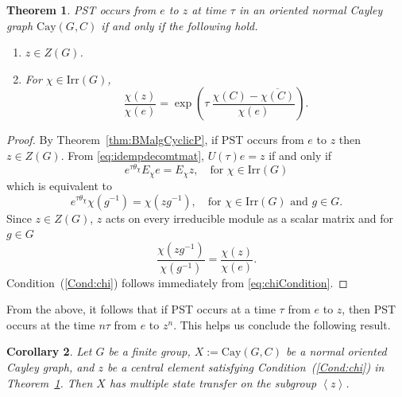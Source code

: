 \documentclass{amsart}
\theoremstyle{plain}
\newtheorem{theorem}{Theorem}[section]
\newtheorem{cor}[theorem]{Corollary}
\theoremstyle{remark}\newtheorem{con}[theorem]{Construction}
\theoremstyle{remark} \newtheorem*{remark}{Remark}
\theoremstyle{remark} \newtheorem{example}{Example}
\newcommand{\mrm}{\mathrm}
\newcommand{\ov}{\overline}
\newcommand{\irr}{\mathrm{Irr}}
\begin{document}
\begin{theorem}\label{thm:characterization}
PST occurs  from $e$ to $z$ at time $\tau$ in an oriented normal Cayley graph $\mrm{Cay}(G, C)$ if and only if the following hold.
\begin{enumerate}
\item $z\in Z(G)$.
\item \label{Cond:chi}
For $\chi \in \irr(G)$,
\[\dfrac{\chi(z)}{\chi(e)}=  \exp\left({\tau\ \dfrac{\chi(C)-\ov{\chi(C)}}{\chi(e)}}\right).\]
\end{enumerate}
\end{theorem}  
\begin{proof}
By Theorem~\ref{thm:BMalgCyclicP}, if PST occurs from $e$ to $z$ then $z\in Z(G)$.
From \eqref{eq:idempdecomtmat}, $U(\tau)e = z$ if and only if
\begin{equation*}
  e^{\tau \theta_{\chi}} E_{\chi}e = E_{\chi} z, \quad \text{for $\chi \in \irr(G)$} 
\end{equation*}
which is equivalent to
\begin{equation}\label{eq:chiCondition}
  e^{\tau \theta_{\chi}} \chi(g^{-1}) = \chi(zg^{-1}), \quad \text{for $\chi \in \irr(G)$ and $g\in G$.}
\end{equation}
Since $z \in Z(G)$, $z$ acts on every irreducible module as a scalar matrix
and for $g\in G$
\begin{equation*}
    \dfrac{\chi(zg^{-1})}{\chi(g^{-1})} = \dfrac{\chi(z)}{\chi(e)}.
\end{equation*}
Condition~(\ref{Cond:chi}) follows immediately from \eqref{eq:chiCondition}.
\end{proof}
From the above, it follows that if PST occurs at a time $\tau$ from $e$ to $z$, then PST occurs at the time $n\tau$ from $e$ to $z^n$. This helps us conclude the following result.
\begin{cor}\label{cor:multistate}
Let $G$ be a finite group, $X:=\mrm{Cay}(G, C)$ be a normal oriented Cayley graph, and $z$ be a central element satisfying Condition~(\ref{Cond:chi}) in Theorem~\ref{thm:characterization}. Then $X$ has multiple state transfer on the subgroup $\left\langle z \right\rangle$.
\end{cor} 
\end{document}
